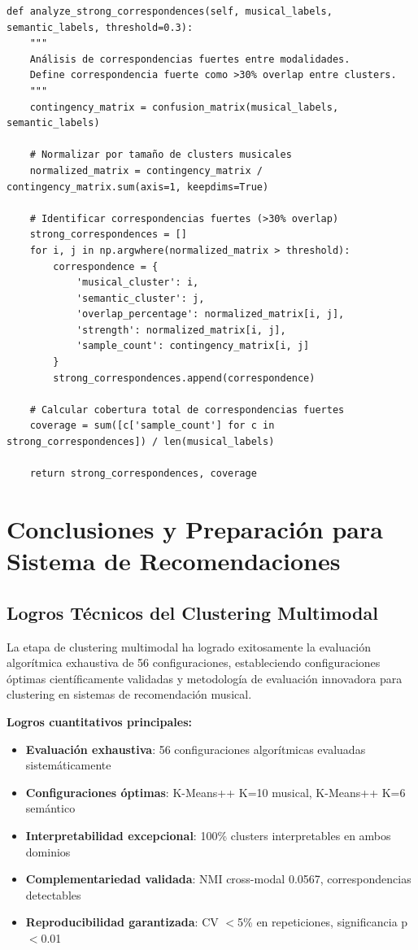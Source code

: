 \documentclass[12pt,a4paper]{article}
\begin{document}
\begin{lstlisting}[caption={Protocolo de Correspondencias Cross-Modal}]
def analyze_strong_correspondences(self, musical_labels, semantic_labels, threshold=0.3):
    """
    Análisis de correspondencias fuertes entre modalidades.
    Define correspondencia fuerte como >30% overlap entre clusters.
    """
    contingency_matrix = confusion_matrix(musical_labels, semantic_labels)

    # Normalizar por tamaño de clusters musicales
    normalized_matrix = contingency_matrix / contingency_matrix.sum(axis=1, keepdims=True)

    # Identificar correspondencias fuertes (>30% overlap)
    strong_correspondences = []
    for i, j in np.argwhere(normalized_matrix > threshold):
        correspondence = {
            'musical_cluster': i,
            'semantic_cluster': j,
            'overlap_percentage': normalized_matrix[i, j],
            'strength': normalized_matrix[i, j],
            'sample_count': contingency_matrix[i, j]
        }
        strong_correspondences.append(correspondence)

    # Calcular cobertura total de correspondencias fuertes
    coverage = sum([c['sample_count'] for c in strong_correspondences]) / len(musical_labels)

    return strong_correspondences, coverage
\end{lstlisting}

\section{Conclusiones y Preparación para Sistema de Recomendaciones}

\subsection{Logros Técnicos del Clustering Multimodal}

La etapa de clustering multimodal ha logrado exitosamente la evaluación algorítmica exhaustiva de 56 configuraciones, estableciendo configuraciones óptimas científicamente validadas y metodología de evaluación innovadora para clustering en sistemas de recomendación musical.

\textbf{Logros cuantitativos principales:}
\begin{itemize}
    \item \textbf{Evaluación exhaustiva}: 56 configuraciones algorítmicas evaluadas sistemáticamente
    \item \textbf{Configuraciones óptimas}: K-Means++ K=10 musical, K-Means++ K=6 semántico
    \item \textbf{Interpretabilidad excepcional}: 100\% clusters interpretables en ambos dominios
    \item \textbf{Complementariedad validada}: NMI cross-modal 0.0567, correspondencias detectables
    \item \textbf{Reproducibilidad garantizada}: CV $<$5\% en repeticiones, significancia p$<$0.01
\end{itemize}
\end{document}
